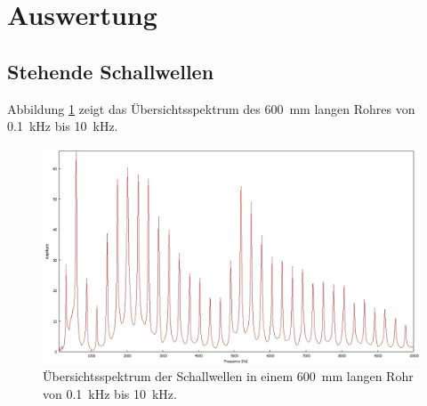 \section{Auswertung}
\label{sec:Auswertung}
\subsection{Stehende Schallwellen}
\label{subsec:Stehende Schallwellen}
Abbildung \ref{fig:1-1} zeigt das Übersichtsspektrum des 600~mm langen Rohres von 0.1~kHz bis 10~kHz.
\begin{figure}
\centering
\includegraphics[width=\textwidth]{content/messungen/Chapter1/1-1img.jpg}
\caption{Übersichtsspektrum der Schallwellen in einem 600~mm langen Rohr von 0.1~kHz bis 10~kHz.}
\label{fig:1-1}
\end{figure}

